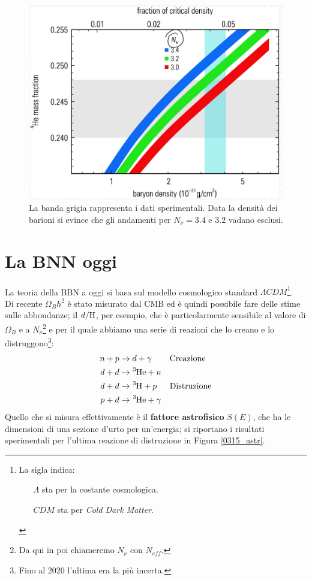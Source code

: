\begin{figure}[h]
    \centering
    \includegraphics[scale=0.2]{Immagini/0315_heliummassfraction2.png}
    \caption{La banda grigia rappresenta i dati sperimentali. Data la densità dei barioni si evince che gli andamenti per $N_\nu = 3.4$ e $3.2$ vadano esclusi.}
    \label{0315_Hefrac2}
\end{figure}
\section{La BNN oggi}
La teoria della BBN a oggi si basa sul modello cosmologico standard $\Lambda CDM$\footnote{La sigla indica:%
\begin{itemize}
    \item[$\Lambda$] sta per la costante cosmologica.
    \item[$CDM$] sta per \textit{Cold Dark Matter}.
\end{itemize}
}.\\
Di recente $\Omega_B h^2$ è stato misurato dal CMB ed è quindi possibile fare delle stime sulle abbondanze; il $d/\ce{H}$, per esempio, che è particolarmente sensibile al valore di $\Omega_B$ e a $N_\nu$\footnote{Da qui in poi chiameremo $N_\nu$ con $N_{eff}$.} e per il quale abbiamo una serie di reazioni che lo creano e lo distruggono\footnote{Fino al 2020 l'ultima era la più incerta.}:
\begin{displaymath}
\begin{aligned}
n + p &\to d + \gamma & &\text{Creazione} \\
d + d &\to \ce{^3He} + n & \\
d + d &\to \ce{^3H}  + p &  &\text{Distruzione} \\
p + d &\to \ce{^3He} + \gamma & 
\end{aligned}
\end{displaymath}
Quello che si misura effettivamente è il \textbf{fattore astrofisico} $S(E)$, che ha le dimensioni di una sezione d'urto per un'energia; si riportano i risultati sperimentali per l'ultima reazione di distruzione in Figura \ref{0315_astr}.

